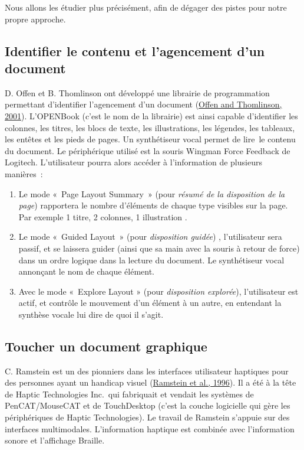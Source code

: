 \documentclass[
]{book}
\providecommand{\tightlist}{%
  \setlength{\itemsep}{0pt}\setlength{\parskip}{0pt}}
\begin{document}
Nous allons les étudier plus précisément, afin de dégager des pistes pour
notre propre approche.

\hypertarget{identifier-le-contenu-et-lagencement-dun-document}{%
\subsection{Identifier le contenu et l'agencement d'un document}\label{identifier-le-contenu-et-lagencement-dun-document}}

D. Offen et B. Thomlinson ont développé une librairie de programmation
permettant d'identifier l'agencement d'un document (\protect\hyperlink{ref-offen2001good}{Offen and Thomlinson, 2001}).
L'OPENBook (c'est le nom
de la librairie) est ainsi capable d'identifier les colonnes, les titres, les
blocs de texte, les illustrations, les légendes, les tableaux, les entêtes et
les pieds de pages. Un synthétiseur vocal permet de lire~le contenu du
document. Le périphérique utilisé est la souris Wingman Force Feedback de
Logitech. L'utilisateur pourra alors accéder à l'information de plusieurs
manières~:

\begin{enumerate}
\def\labelenumi{\arabic{enumi}.}
\tightlist
\item
  Le mode «~Page Layout Summary~» (pour
  \emph{résumé de la disposition de la page}) rapportera le nombre
  d'éléments de chaque type visibles sur la page. Par exemple 1 titre, 2
  colonnes, 1 illustration .
\item
  Le mode «~Guided Layout~» (pour
  \emph{disposition guidée}) , l'utilisateur sera passif, et se laissera
  guider (ainsi que sa main avec la souris à retour de force) dans un ordre
  logique dans la lecture du document. Le synthétiseur vocal annonçant le nom
  de chaque élément.
\item
  Avec le mode «~Explore Layout » (pour
  \emph{disposition explorée}), l'utilisateur est actif, et contrôle le
  mouvement d'un élément à un autre, en entendant la synthèse vocale lui dire
  de quoi il s'agit.
\end{enumerate}

\hypertarget{toucher-un-document-graphique}{%
\subsection{Toucher un document graphique}\label{toucher-un-document-graphique}}

C. Ramstein est un des pionniers dans les interfaces utilisateur haptiques
pour des personnes ayant un handicap visuel (\protect\hyperlink{ref-ramstein1996touching}{Ramstein et al., 1996}). Il a été à
la tête de Haptic Technologies Inc.~qui fabriquait et vendait les systèmes de
PenCAT/MouseCAT et de TouchDesktop (c'est la couche logicielle qui gère les
périphériques de Haptic Technologies). Le travail de Ramstein s'appuie sur
des interfaces multimodales. L'information haptique est combinée avec
l'information sonore et l'affichage Braille.
\end{document}
